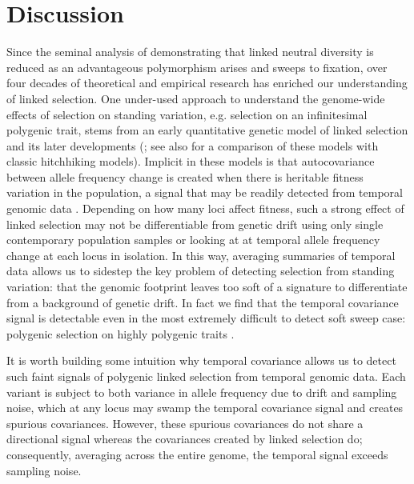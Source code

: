 \documentclass[11pt]{article}
\begin{document}
\section{Discussion}

Since the seminal analysis of \textcite{Maynard_Smith1974-lc} demonstrating
that linked neutral diversity is reduced as an advantageous polymorphism arises
and sweeps to fixation, over four decades of theoretical and empirical research
has enriched our understanding of linked selection.  One under-used approach to
understand the genome-wide effects of selection on standing variation, e.g.
selection on an infinitesimal polygenic trait, stems from an early quantitative
genetic model of linked selection \parencite{Robertson1961-ho} and its later
developments
(\cite{Santiago1995-hx,Santiago1998-bs,Wray1990-zf,J_A_Woolliams_N_R_Wray_R_Thompson2008-qo};
see also \cite{Barton2000-zg} for a comparison of these models with classic
hitchhiking models). Implicit in these models is that autocovariance between
allele frequency change is created when there is heritable fitness variation in
the population, a signal that may be readily detected from temporal genomic
data \parencite{Buffalo2019-io}.  Depending on how many loci affect fitness,
such a strong effect of linked selection may not be differentiable from genetic
drift using only single contemporary population samples or looking at at
temporal allele frequency change at each locus in isolation.  In this way,
averaging summaries of temporal data allows us to sidestep the key problem of
detecting selection from standing variation: that the genomic footprint leaves
too soft of a signature to differentiate from a background of genetic drift. In
fact we find that the temporal covariance signal is detectable even in the most
extremely difficult to detect soft sweep case: polygenic selection on highly
polygenic traits \parencite{Buffalo2019-io}.

It is worth building some intuition why temporal covariance allows us to detect
such faint signals of polygenic linked selection from temporal genomic data.
Each variant is subject to both variance in allele frequency due to drift and
sampling noise, which at any locus may swamp the temporal covariance signal and
creates spurious covariances. However, these spurious covariances do not share
a directional signal whereas the covariances created by linked selection do;
consequently, averaging across the entire genome, the temporal signal exceeds
sampling noise. 
\end{document}
